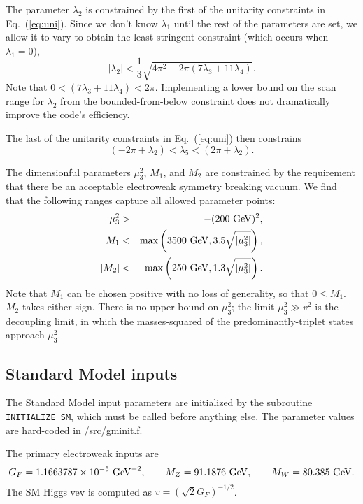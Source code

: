 \documentclass[11pt]{article}
\begin{document}
The parameter $\lambda_2$ is constrained by the first of the unitarity constraints in Eq.~(\ref{eq:uni}).  Since we don't know $\lambda_1$ until the rest of the parameters are set, we allow it to vary to obtain the least stringent constraint (which occurs when $\lambda_1 = 0$),
\begin{equation}
	|\lambda_2| < \frac{1}{3} \sqrt{4 \pi^2 - 2 \pi (7 \lambda_3 + 11 \lambda_4)}.
\end{equation}
Note that $0 < (7 \lambda_3 + 11 \lambda_4) < 2 \pi$.  Implementing a lower bound on the scan range for $\lambda_2$ from the bounded-from-below constraint does not dramatically improve the code's efficiency.

The last of the unitarity constraints in Eq.~(\ref{eq:uni}) then constrains 
\begin{equation}
	(-2 \pi + \lambda_2) < \lambda_5 < (2 \pi + \lambda_2).
\end{equation}

The dimensionful parameters $\mu_3^2$, $M_1$, and $M_2$ are constrained by the requirement that there be an acceptable electroweak symmetry breaking vacuum.  We find that the following ranges capture all allowed parameter points:
\begin{eqnarray}
	\mu_3^2 &>& -(200~{\rm GeV})^2, \nonumber \\
	M_1 &<& {\rm max}\left(3500~{\rm GeV}, 3.5 \sqrt{|\mu_3^2|}\right), \nonumber \\
	|M_2| &<& {\rm max}\left(250~{\rm GeV}, 1.3 \sqrt{|\mu_3^2|}\right).
\end{eqnarray}
Note that $M_1$ can be chosen positive with no loss of generality, so that $0 \leq M_1$.  $M_2$ takes either sign.  There is no upper bound on $\mu_3^2$; the limit $\mu_3^2 \gg v^2$ is the decoupling limit, in which the masses-squared of the predominantly-triplet states approach $\mu_3^2$.

\subsection{Standard Model inputs}

The Standard Model input parameters are initialized by the subroutine {\tt INITIALIZE\_SM}, which must be called before anything else.  The parameter values are hard-coded in /src/gminit.f.

The primary electroweak inputs are~\cite{LHCHXSWG-INT-2015-006}
\begin{equation}
	G_F = 1.1663787 \times 10^{-5}~{\rm GeV}^{-2}, \qquad
	M_Z = 91.1876~{\rm GeV}, \qquad
	M_W = 80.385~{\rm GeV}.
\end{equation}
The SM Higgs vev is computed as $v = (\sqrt{2} G_F)^{-1/2}$.
\end{document}
